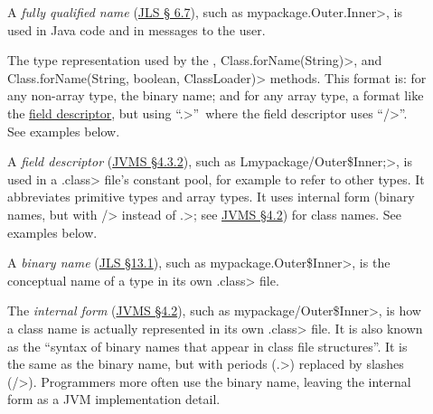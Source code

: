 \begin{description}

\item[]
  A \emph{fully qualified name} (\href{https://docs.oracle.com/javase/specs/jls/se25/html/jls-6.html#jls-6.7}{JLS \S
    6.7}), such as
  \<mypackage.Outer.Inner>, is used in Java code and in messages to
  the user.

\item[]
\begin{sloppypar}
  The type representation used by the
  , \<Class.forName(String)>,
  and \<Class.forName(String, boolean, ClassLoader)> methods.  This format
  is:  for any non-array type, the binary name; and for any array type, a
  format like the
  \href{https://docs.oracle.com/javase/specs/jvms/se17/html/jvms-4.html#jvms-4.3.2}{field
    descriptor}, but using
  ``\<.>''~where the field descriptor uses ``\</>''.  See examples below.
\end{sloppypar}

\item[]
  A \emph{field descriptor} (\href{https://docs.oracle.com/javase/specs/jvms/se17/html/jvms-4.html#jvms-4.3.2}{JVMS \S 4.3.2}), such as
  \<Lmypackage/Outer\$Inner;>, is used in a \<.class> file's constant pool,
  for example to refer to other types.  It abbreviates primitive types and
  array types.  It uses internal form (binary names, but with \</> instead of
  \<.>; see
  \href{https://docs.oracle.com/javase/specs/jvms/se17/html/jvms-4.html#jvms-4.2.1}{JVMS
    \S 4.2}) for class names.  See examples below.

\item[]
  A \emph{binary name} (\href{https://docs.oracle.com/javase/specs/jls/se25/html/jls-13.html#jls-13.1}{JLS \S 13.1}), such as
  \<mypackage.Outer\$Inner>, is
  the conceptual name of a type in its own \<.class> file.

\item[]
  The \emph{internal form}
  (\href{https://docs.oracle.com/javase/specs/jvms/se17/html/jvms-4.html#jvms-4.2}{JVMS
    \S 4.2}), such as \<mypackage/Outer\$Inner>, is how a class name is
  actually represented in its own \<.class> file.  It is also known as the
  ``syntax of binary names that appear in class file structures''.  It is
  the same as the binary name, but with periods (\<.>) replaced by slashes
  (\</>).  Programmers more often use the binary name, leaving the internal
  form as a JVM implementation detail.


\end{description}
